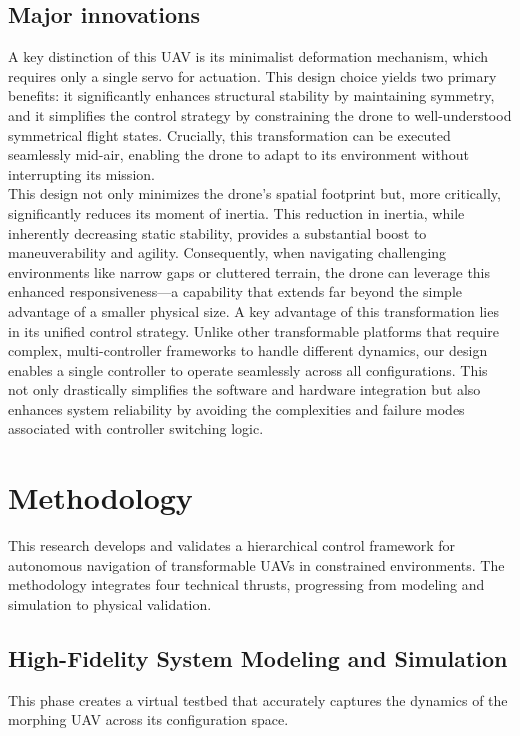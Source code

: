 \documentclass[11pt,a4paper]{article}
\begin{document}
\subsection{Major innovations}
A key distinction of this UAV is its minimalist deformation mechanism, which requires only a single servo for actuation. This design choice yields two primary benefits: it significantly enhances structural stability by maintaining symmetry, and it simplifies the control strategy by constraining the drone to well-understood symmetrical flight states. Crucially, this transformation can be executed seamlessly mid-air, enabling the drone to adapt to its environment without interrupting its mission.\\
This design not only minimizes the drone’s spatial footprint but, more critically, significantly reduces its moment of inertia. This reduction in inertia, while inherently decreasing static stability, provides a substantial boost to maneuverability and agility. Consequently, when navigating challenging environments like narrow gaps or cluttered terrain, the drone can leverage this enhanced responsiveness—a capability that extends far beyond the simple advantage of a smaller physical size. A key advantage of this transformation lies in its unified control strategy. Unlike other transformable platforms that require complex, multi-controller frameworks to handle different dynamics, our design enables a single controller to operate seamlessly across all configurations. This not only drastically simplifies the software and hardware integration but also enhances system reliability by avoiding the complexities and failure modes associated with controller switching logic.

\section{Methodology}
This research develops and validates a hierarchical control framework for autonomous navigation of transformable UAVs in constrained environments. The methodology integrates four technical thrusts, progressing from modeling and simulation to physical validation.

\subsection{High-Fidelity System Modeling and Simulation}
This phase creates a virtual testbed that accurately captures the dynamics of the morphing UAV across its configuration space.
\end{document}
